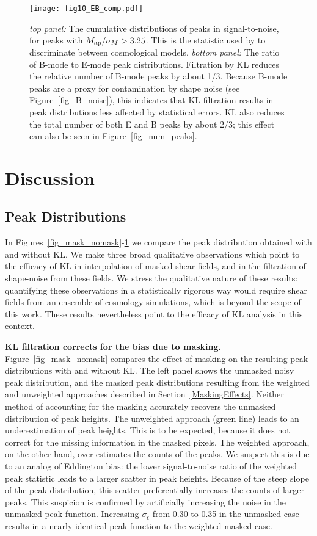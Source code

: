 \begin{figure} 
 \centering
 \texttt{[image: fig10\_EB\_comp.pdf]}
 \caption{
   \textit{top panel:} The cumulative distributions of peaks in 
   signal-to-noise, for peaks with $M_{\rm ap}/\sigma_M > 3.25$.
   This is the statistic used by \citet{Dietrich10} to discriminate
   between cosmological models.  \textit{bottom panel:}  The ratio
   of B-mode to E-mode peak distributions.  Filtration by KL reduces
   the relative number of B-mode peaks by about 1/3.  Because B-mode
   peaks are a proxy for contamination by shape noise
   (see Figure~\ref{fig_B_noise}), this indicates that KL-filtration
   results in peak distributions less affected by statistical errors.
   KL also reduces the total number of both E and B peaks by about 2/3; 
   this effect can also be seen in Figure~\ref{fig_num_peaks}.
   \label{fig_EB_comp} 
 }
\end{figure}

\section{Discussion}
\label{Discussion}
\subsection{\Map Peak Distributions}
In Figures~\ref{fig_mask_nomask}-\ref{fig_EB_comp}
we compare the peak distribution obtained with and without KL.
We make three broad qualitative observations which point to the
efficacy of KL in interpolation of masked shear fields, and in
the filtration of shape-noise from these fields.  We stress the
qualitative nature of these results: quantifying 
these observations in a statistically rigorous way would require
shear fields from an ensemble of cosmology simulations, which is beyond the
scope of this work.  These results nevertheless point to the
efficacy of KL analysis in this context.

\textbf{KL filtration corrects for the bias due to masking.}
Figure~\ref{fig_mask_nomask} compares the effect of masking on the
resulting peak distributions with and without KL.  The left panel
shows the unmasked noisy peak distribution, and the masked
peak distributions resulting from the weighted and unweighted
approaches described in Section~\ref{MaskingEffects}.  
Neither method of accounting for the masking accurately 
recovers the unmasked distribution of peak heights. The unweighted
approach (green line) leads to an underestimation of peak heights.  
This is to be expected, because it does not correct for the missing 
information in the masked pixels.  The weighted approach, on the other
hand, over-estimates the counts of the peaks.  We suspect
this is due to an analog of Eddington bias: the lower signal-to-noise 
ratio of the weighted peak statistic leads to a larger scatter in peak heights.
Because of the steep slope of the peak distribution, this scatter 
preferentially increases the counts of larger peaks.  This suspicion is
confirmed by artificially increasing the noise in the unmasked peak function.
Increasing $\sigma_\epsilon$ from 0.30 to 0.35 in the unmasked case
results in a nearly identical peak function to the weighted masked case.

